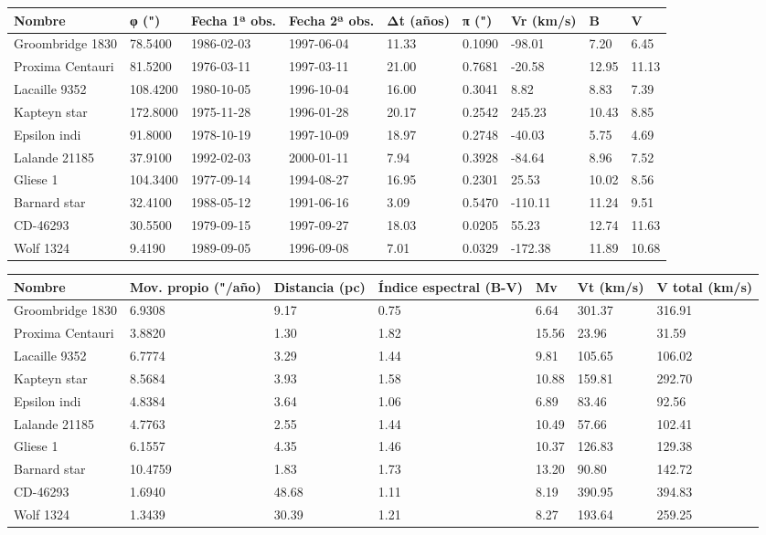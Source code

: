 \begin{tabular}{lllllllll}
\toprule
Nombre & φ (") & Fecha 1ª obs. & Fecha 2ª obs. & Δt (años) & π (") & Vr (km/s) & B & V \\
\midrule
Groombridge 1830 & 78.5400 & 1986-02-03 & 1997-06-04 & 11.33 & 0.1090 & -98.01 & 7.20 & 6.45 \\
Proxima Centauri & 81.5200 & 1976-03-11 & 1997-03-11 & 21.00 & 0.7681 & -20.58 & 12.95 & 11.13 \\
Lacaille 9352 & 108.4200 & 1980-10-05 & 1996-10-04 & 16.00 & 0.3041 & 8.82 & 8.83 & 7.39 \\
Kapteyn star & 172.8000 & 1975-11-28 & 1996-01-28 & 20.17 & 0.2542 & 245.23 & 10.43 & 8.85 \\
Epsilon indi & 91.8000 & 1978-10-19 & 1997-10-09 & 18.97 & 0.2748 & -40.03 & 5.75 & 4.69 \\
Lalande 21185 & 37.9100 & 1992-02-03 & 2000-01-11 & 7.94 & 0.3928 & -84.64 & 8.96 & 7.52 \\
Gliese 1 & 104.3400 & 1977-09-14 & 1994-08-27 & 16.95 & 0.2301 & 25.53 & 10.02 & 8.56 \\
Barnard star & 32.4100 & 1988-05-12 & 1991-06-16 & 3.09 & 0.5470 & -110.11 & 11.24 & 9.51 \\
CD-46293 & 30.5500 & 1979-09-15 & 1997-09-27 & 18.03 & 0.0205 & 55.23 & 12.74 & 11.63 \\
Wolf 1324 & 9.4190 & 1989-09-05 & 1996-09-08 & 7.01 & 0.0329 & -172.38 & 11.89 & 10.68 \\
\bottomrule
\end{tabular}


\begin{tabular}{lllllll}
\toprule
Nombre & Mov. propio ("/año) & Distancia (pc) & Índice espectral (B-V) & Mv & Vt (km/s) & V total (km/s) \\
\midrule
Groombridge 1830 & 6.9308 & 9.17 & 0.75 & 6.64 & 301.37 & 316.91 \\
Proxima Centauri & 3.8820 & 1.30 & 1.82 & 15.56 & 23.96 & 31.59 \\
Lacaille 9352 & 6.7774 & 3.29 & 1.44 & 9.81 & 105.65 & 106.02 \\
Kapteyn star & 8.5684 & 3.93 & 1.58 & 10.88 & 159.81 & 292.70 \\
Epsilon indi & 4.8384 & 3.64 & 1.06 & 6.89 & 83.46 & 92.56 \\
Lalande 21185 & 4.7763 & 2.55 & 1.44 & 10.49 & 57.66 & 102.41 \\
Gliese 1 & 6.1557 & 4.35 & 1.46 & 10.37 & 126.83 & 129.38 \\
Barnard star & 10.4759 & 1.83 & 1.73 & 13.20 & 90.80 & 142.72 \\
CD-46293 & 1.6940 & 48.68 & 1.11 & 8.19 & 390.95 & 394.83 \\
Wolf 1324 & 1.3439 & 30.39 & 1.21 & 8.27 & 193.64 & 259.25 \\
\bottomrule
\end{tabular}
